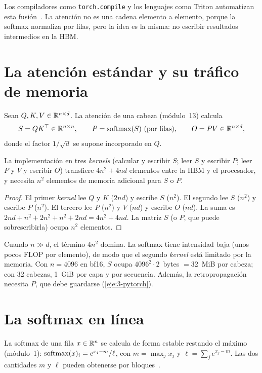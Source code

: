Los compiladores como \texttt{torch.compile} y los lenguajes como Triton automatizan esta fusión~\cite{cs336}. La atención no es una cadena elemento a elemento, porque la softmax normaliza por filas, pero la idea es la misma: no escribir resultados intermedios en la HBM.

\section{La atención estándar y su tráfico de memoria}

Sean $Q,K,V\in\mathbb{R}^{n\times d}$. La atención de una cabeza (módulo~13) calcula
\[
S=QK\T\in\R^{n\times n},\qquad P=\softmax(S)\ \text{(por filas)},\qquad O=PV\in\R^{n\times d},
\]
donde el factor $1/\sqrt{d}$ se supone incorporado en $Q$.

\begin{proposicion}\label{prop:atencion-estandar}
La implementación en tres \emph{kernels} (calcular y escribir $S$; leer $S$ y escribir $P$; leer $P$ y $V$ y escribir $O$) transfiere $4n^{2}+4nd$ elementos entre la HBM y el procesador, y necesita $n^{2}$ elementos de memoria adicional para $S$ o $P$.
\end{proposicion}

\begin{proof}
El primer \emph{kernel} lee $Q$ y $K$ ($2nd$) y escribe $S$ ($n^{2}$). El segundo lee $S$ ($n^{2}$) y escribe $P$ ($n^{2}$). El tercero lee $P$ ($n^{2}$) y $V$ ($nd$) y escribe $O$ ($nd$). La suma es $2nd+n^{2}+2n^{2}+n^{2}+2nd=4n^{2}+4nd$. La matriz $S$ (o $P$, que puede sobrescribirla) ocupa $n^{2}$ elementos.
\end{proof}

Cuando $n\gg d$, el término $4n^{2}$ domina. La softmax tiene intensidad baja (unos pocos FLOP por elemento), de modo que el segundo \emph{kernel} está limitado por la memoria. Con $n=4096$ en bf16, $S$ ocupa $4096^{2}\cdot 2$~bytes $=32$~MiB por cabeza; con 32 cabezas, 1~GiB por capa y por secuencia. Además, la retropropagación necesita $P$, que debe guardarse (\cref{eje:3-pytorch}).

\section{La softmax en línea}

La softmax de una fila $x\in\mathbb{R}^{n}$ se calcula de forma estable restando el máximo (módulo~1): $\operatorname{softmax}(x)_i=e^{x_i-m}/\ell$, con $m=\max_j x_j$ y $\ell=\sum_j e^{x_j-m}$. Las dos cantidades $m$ y $\ell$ pueden obtenerse por bloques~\cite{milakov}.

